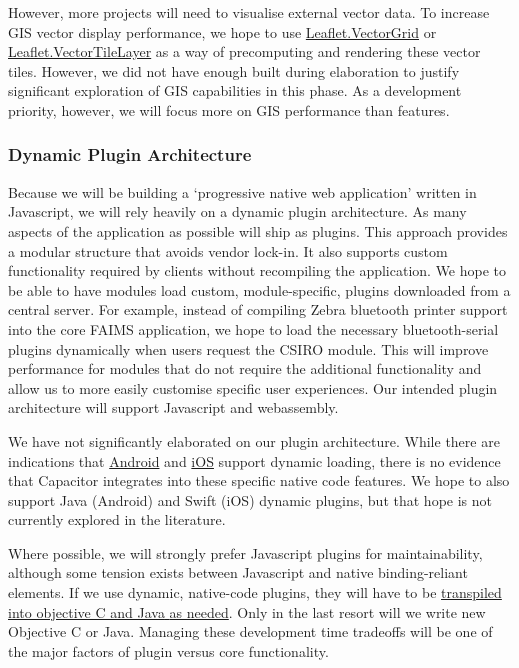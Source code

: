 \documentclass[a4paper,headings=small fontsize=10pt]{scrreprt}
\begin{document}
However, more projects will need to visualise external vector data. To
increase GIS vector display performance, we hope to use
\href{https://github.com/Leaflet/Leaflet.VectorGrid}{{Leaflet.VectorGrid}}
or
\href{https://leafletjs.com/plugins.html\#vector-tiles}{{Leaflet.VectorTileLayer}}
as a way of precomputing and rendering these vector tiles. However, we
did not have enough built during elaboration to justify significant
exploration of GIS capabilities in this phase. As a development
priority, however, we will focus more on GIS performance than features.

\subsubsection{Dynamic Plugin
Architecture}

Because we will be building a `progressive native web application'
written in Javascript, we will rely heavily on a dynamic plugin
architecture. As many aspects of the application as possible will ship
as plugins. This approach provides a modular structure that avoids
vendor lock-in. It also supports custom functionality required by
clients without recompiling the application. We hope to be able to have
modules load custom, module-specific, plugins downloaded from a central
server. For example, instead of compiling Zebra bluetooth printer
support into the core FAIMS application, we hope to load the necessary
bluetooth-serial plugins dynamically when users request the CSIRO
module. This will improve performance for modules that do not require
the additional functionality and allow us to more easily customise
specific user experiences. Our intended plugin architecture will support
Javascript and webassembly.

We have not significantly elaborated on our plugin architecture. While
there are indications that
\href{https://developer.android.com/guide/app-bundle/play-feature-delivery}{{Android}}
and
\href{https://theswiftdev.com/building-and-loading-dynamic-libraries-at-runtime-in-swift/}{{iOS}}
support dynamic loading, there is no evidence that Capacitor integrates
into these specific native code features. We hope to also support Java
(Android) and Swift (iOS) dynamic plugins, but that hope is not
currently explored in the literature.

Where possible, we will strongly prefer Javascript plugins for
maintainability, although some tension exists between Javascript and
native binding-reliant elements. If we use dynamic, native-code plugins,
they will have to be
\href{https://www.joshmorony.com/creating-a-local-capacitor-plugin-to-access-native-functionality-ios-swift/}{{transpiled
into objective C and Java} {as needed}}. Only in the last resort will we
write new Objective C or Java. Managing these development time tradeoffs
will be one of the major factors of plugin versus core functionality.
\end{document}
